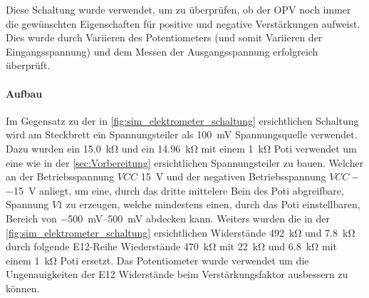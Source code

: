 \documentclass[12pt,english,ngerman]{scrartcl}
\begin{document}
Diese Schaltung wurde verwendet, um zu überprüfen, ob der OPV noch immer die
gewünschten Eigenschaften für positive und negative Verstärkungen aufweist. Dies
wurde durch Variieren des Potentiometers (und somit Variieren der
Eingangsspannung) und dem Messen der Ausgangsspannung erfolgreich überprüft.

\paragraph{Aufbau}
Im Gegensatz zu der in \autoref{fig:sim_elektrometer_schaltung} ersichtlichen
Schaltung wird am Steckbrett ein Spannungsteiler als \SI{100}{mV}
Spannungsquelle verwendet. Dazu wurden ein \SI{15.0}{\kilo\ohm} und ein
\SI{14.96}{\kilo\ohm} mit einem \SI{1}{\kilo\ohm} Poti verwendet um eine wie in
der \autoref{sec:Vorbereitung} ersichtlichen Spannungsteiler zu bauen. Welcher
an der Betriebsspannung $VCC$ \SI{+15}{\volt} und der negativen
Betriebsspannung $VCC-$ \SI{-15}{\volt} anliegt, um eine, durch das dritte
mittelere Bein des Poti abgreifbare, Spannung $V1$ zu erzeugen, welche
mindestens einen, durch das Poti einstellbaren, Bereich von
\SIrange{-500}{500}{\milli\volt} abdecken kann. Weiters wurden die in der
\autoref{fig:sim_elektrometer_schaltung} ersichtlichen Widerstände
\SI{492}{\kilo\ohm} und \SI{7.8}{\kilo\ohm} durch folgende E12-Reihe
Wiederstände \SI{470}{\kilo\ohm} mit \SI{22}{\kilo\ohm} und \SI{6.8}{\kilo\ohm}
mit einem \SI{1}{\kilo\ohm} Poti ersetzt. Das Potentiometer wurde verwendet um
die Ungenauigkeiten der E12 Widerstände beim Verstärkungsfaktor ausbessern zu
können.
\end{document}

